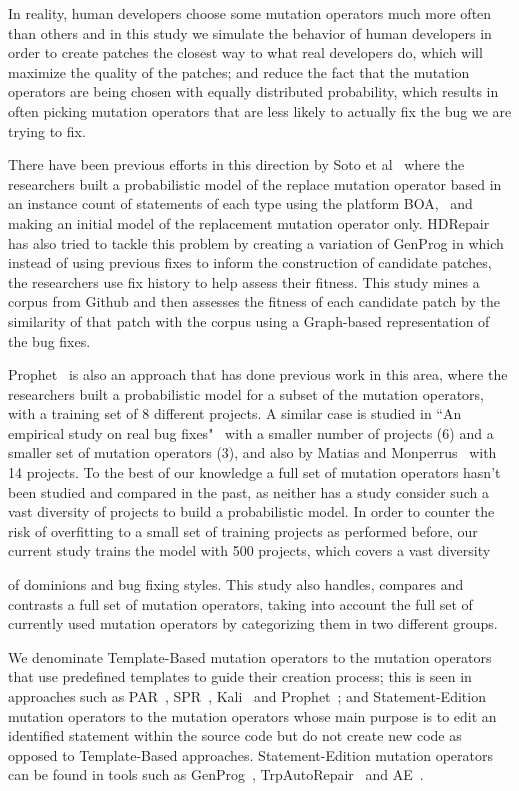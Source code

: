 \documentclass[conference]{IEEEtran}
\begin{document}
In reality, human developers choose some mutation operators 
much more often than 
others and in this study we simulate the behavior of human developers in order 
to create patches the closest way to what real developers do, which will 
maximize the quality of the patches; and reduce the fact that the mutation 
operators are being chosen with equally 
distributed probability, which results in often 
picking mutation operators that are less likely to actually fix the bug we are 
trying to fix.

There have been previous efforts in this direction by Soto et al~\cite{Soto15} 
where the researchers built a probabilistic model of the replace mutation 
operator based in 
an instance count of statements of each type using the platform 
BOA,~\cite{dyer2013} and making an initial model of the replacement mutation 
operator only. HDRepair~\cite{xuan16} has also tried to tackle this problem by 
creating a variation of GenProg in which instead of using previous fixes to
inform the construction of candidate patches, the researchers use fix history
to help assess their fitness. This study mines a corpus from Github and then assesses the fitness of each candidate patch by the similarity of that patch with the corpus using a Graph-based representation of the bug fixes.

Prophet~\cite{long15} is also an approach that has done previous work in this 
area, where the researchers built a 
probabilistic model for a subset of the mutation operators, with a training set 
of 8 different projects. A similar case is studied in ``An empirical study on 
real bug fixes"~\cite{zhong15} with a smaller number of projects (6) and a 
smaller set of 
mutation operators (3), and also by Matias and Monperrus~\cite{matias15} with 14 
projects. To the best of our knowledge a full set of mutation 
operators hasn't been studied and compared in the past, as neither has a study 
consider such a vast diversity of projects to build a probabilistic model. In 
order to counter the 
risk of overfitting to a small set of training projects as performed before, our 
current study trains the model with 500 projects, which covers a vast diversity 

of dominions and bug fixing styles. This study also 
handles, compares and contrasts a full set of mutation operators, taking into
account the full set of currently used mutation operators by categorizing them 
in two different groups. 


We denominate Template-Based mutation operators to the mutation operators that 
use predefined templates to guide their creation process; this is seen in 
approaches such 
as PAR~\cite{kim2013}, SPR~\cite{fan15}, Kali~\cite{Qi15} and Prophet~\cite{Long2016}; and 
Statement-Edition mutation operators to the mutation operators whose main purpose is to edit an identified statement within the source code but do not create new code as opposed to 
Template-Based approaches. Statement-Edition mutation operators can be found in 
tools such as GenProg~\cite{legoues2012}, TrpAutoRepair~\cite{Qi13} and 
AE~\cite{Weimer13}.
\end{document}
